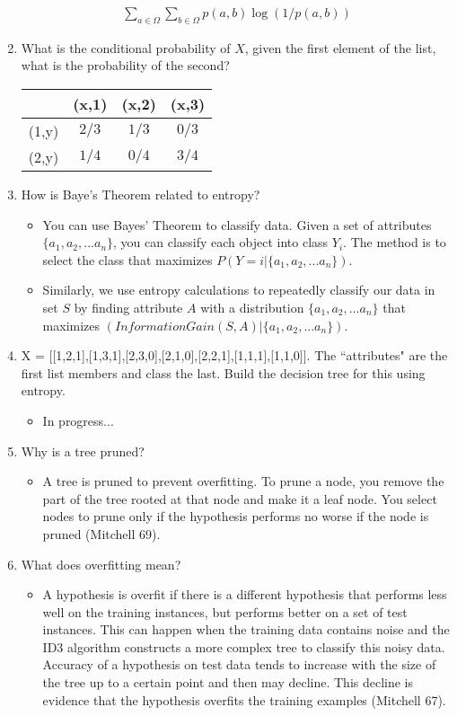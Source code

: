 \documentclass{article}
\begin{document}
\begin{enumerate}
\begin{eqnarray}
\sum_{a \in \Omega}\sum_{b \in \Omega}p(a,b)\log (1/p(a,b))
\end{eqnarray}
\item What is the conditional probability of $X$, given the first element of the list, what is the probability of the second?  
\begin{center}
\begin{tabular}{||c || c c c ||} 
 \hline
 & (x,1) & (x,2) & (x,3) \\ [0.5ex] 
 \hline\hline
 (1,y) & $2/3$ & $1/3$ & $0/3$ \\
 \hline
 (2,y) & $1/4$ & $0/4$ & $3/4$ \\
 \hline
\end{tabular}
\end{center}
\item How is Baye's Theorem related to entropy?
\begin{itemize}
    \item You can use Bayes' Theorem to classify data. Given a set of attributes $\{a_1,a_2,...a_n\}$, you can classify each object into class $Y_i$. The method is to select the class that maximizes $P(Y=i|\{a_1,a_2,...a_n\})$.
    \item Similarly, we use entropy calculations to repeatedly classify our data in set $S$ by finding attribute $A$ with a distribution $\{a_1,a_2,...a_n\}$ that maximizes $(Information Gain(S,A)|\{a_1,a_2,...a_n\})$.
\end{itemize}
\item X = [[1,2,1],[1,3,1],[2,3,0],[2,1,0],[2,2,1],[1,1,1],[1,1,0]].  The ``attributes" are the first list members and class the last.  Build the decision tree for this using entropy.
\begin{itemize}
    \item In progress...
\end{itemize}
\item Why is a tree pruned?
\begin{itemize}
    \item A tree is pruned to prevent overfitting. To prune a node, you remove the part of the tree rooted at that node and make it a leaf node. You select nodes to prune only if the hypothesis performs no worse if the node is pruned (Mitchell 69).
\end{itemize}
\item What does overfitting mean?
\begin{itemize}
    \item A hypothesis is overfit if there is a different hypothesis that performs less well on the training instances, but performs better on a set of test instances. This can happen when the training data contains noise and the ID3 algorithm constructs a more complex tree to classify this noisy data. Accuracy of a hypothesis on test data tends to increase with the size of the tree up to a certain point and then may decline. This decline is evidence that the hypothesis overfits the training examples (Mitchell 67).

\end{itemize}
\end{enumerate}
\end{document}
